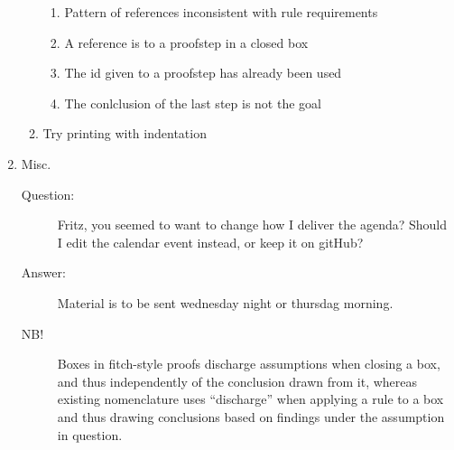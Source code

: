 \documentclass[a4paper]{article}
\begin{document}
\begin{enumerate}
\begin{enumerate}[\HollowBox]
\begin{enumerate}[\HollowBox]
          \item Pattern of references inconsistent with rule requirements
          \item A reference is to a proofstep in a closed box
          \item The id given to a proofstep has already been used
          \item The conlclusion of the last step is not the goal
        \end{enumerate}
      \item Try printing with indentation
    \end{enumerate}
  \item Misc.
    \begin{description}
      \item[Question:] Fritz, you seemed to want to change how I deliver the
      agenda?
      Should I edit the calendar event instead, or keep it on gitHub?
      \item[Answer:] Material is to be sent wednesday night or thursdag 
      morning.
      \item[NB!] Boxes in fitch-style proofs discharge assumptions when
      closing a box, and thus independently of the conclusion drawn from it,
      whereas existing nomenclature uses ``discharge'' when applying a rule
      to a box and thus drawing conclusions based on findings under the
      assumption in question.
    \end{description}
\end{enumerate}
\end{document}
